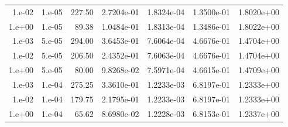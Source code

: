 \begin{table}[htbp]
\begin{tabular}{rrrrrrr}
1.e-02 & 1.e-05 & 227.50 & 2.7204e-01 & 1.8324e-04 & 1.3500e-01 & 1.8020e+00 \\
1.e+00 & 1.e-05 & 89.38 & 1.0484e-01 & 1.8313e-04 & 1.3486e-01 & 1.8022e+00 \\
1.e-03 & 5.e-05 & 294.00 & 3.6453e-01 & 7.6064e-04 & 4.6676e-01 & 1.4704e+00 \\
1.e-02 & 5.e-05 & 206.50 & 2.4352e-01 & 7.6063e-04 & 4.6676e-01 & 1.4704e+00 \\
1.e+00 & 5.e-05 & 80.00 & 9.8268e-02 & 7.5971e-04 & 4.6615e-01 & 1.4709e+00 \\
1.e-03 & 1.e-04 & 275.25 & 3.3610e-01 & 1.2233e-03 & 6.8197e-01 & 1.2333e+00 \\
1.e-02 & 1.e-04 & 179.75 & 2.1795e-01 & 1.2233e-03 & 6.8197e-01 & 1.2333e+00 \\
1.e+00 & 1.e-04 & 65.62 & 8.6980e-02 & 1.2228e-03 & 6.8153e-01 & 1.2337e+00 \\
\bottomrule
\end{tabular}
\end{table}
